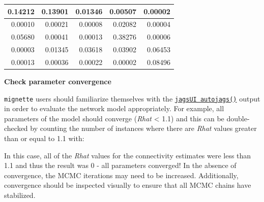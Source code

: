 \documentclass[
]{book}
\newenvironment{Shaded}{\begin{snugshade}}{\end{snugshade}}
\newcommand{\AttributeTok}[1]{\textcolor[rgb]{0.13,0.29,0.53}{#1}}
\newcommand{\DecValTok}[1]{\textcolor[rgb]{0.00,0.00,0.81}{#1}}
\newcommand{\FloatTok}[1]{\textcolor[rgb]{0.00,0.00,0.81}{#1}}
\newcommand{\FunctionTok}[1]{\textcolor[rgb]{0.13,0.29,0.53}{\textbf{#1}}}
\newcommand{\NormalTok}[1]{#1}
\newcommand{\SpecialCharTok}[1]{\textcolor[rgb]{0.81,0.36,0.00}{\textbf{#1}}}
\newcommand{\StringTok}[1]{\textcolor[rgb]{0.31,0.60,0.02}{#1}}
\begin{document}
\begin{tabular}{r|r|r|r|r}
\hline
0.14212 & 0.13901 & 0.01346 & 0.00507 & 0.00002\\
\hline
0.00010 & 0.00021 & 0.00008 & 0.02082 & 0.00004\\
\hline
0.05680 & 0.00041 & 0.00013 & 0.38276 & 0.00006\\
\hline
0.00003 & 0.01345 & 0.03618 & 0.03902 & 0.06453\\
\hline
0.00013 & 0.00036 & 0.00022 & 0.00002 & 0.08496\\
\hline
\end{tabular}

\textbf{Check parameter convergence}

\texttt{mignette} users should familiarize themselves with the \href{https://rdrr.io/cran/jagsUI/man/autojags.html}{\texttt{jagsUI\ autojags()}} output in order to evaluate the network model appropriately. For example, all parameters of the model should converge (\emph{Rhat} \textless{} 1.1) and this can be double-checked by counting the number of instances where there are \emph{Rhat} values greater than or equal to 1.1 with:

\begin{Shaded}
\end{Shaded}

In this case, all of the \emph{Rhat} values for the connectivity estimates were less than 1.1 and thus the result was 0 - all parameters converged! In the absence of convergence, the MCMC iterations may need to be increased. Additionally, convergence should be inspected visually to ensure that all MCMC chains have stabilized.

\begin{Shaded}
\end{Shaded}
\end{document}
